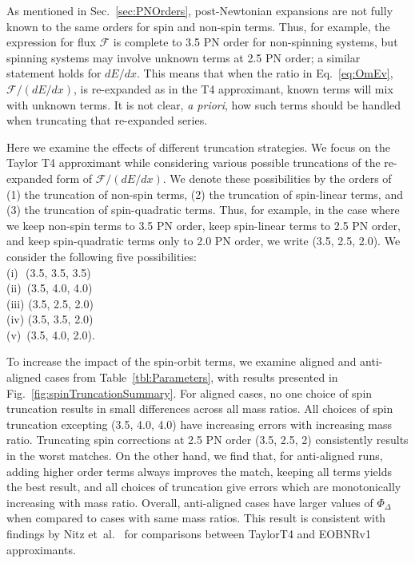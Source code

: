 \documentclass[aps,prd,amsmath,floatfix,twocolumn,superscriptaddress,nofootinbib,showpacs]{revtex4-1}
\begin{document}
As mentioned in Sec.~\ref{sec:PNOrders}, post-Newtonian expansions are
not fully known to the same orders for spin and non-spin terms.  Thus,
for example, the expression for flux $\mathcal{F}$ is complete to 3.5
PN order for non-spinning systems, but spinning systems may involve
unknown terms at 2.5 PN order; a similar statement holds for $dE/dx$.
This means that when the ratio in Eq.~\eqref{eq:OmEv}, $\mathcal{F} /
(dE/dx)$, is re-expanded as in the T4 approximant, known terms will
mix with unknown terms.  It is not clear, \textit{a priori}, how such
terms should be handled when truncating that re-expanded series.

Here we examine the effects of different truncation strategies.  We
focus on the Taylor T4 approximant while considering various possible
truncations of the re-expanded form of $\mathcal{F} / (dE/dx)$.  We
denote these possibilities by the orders of (1) the truncation of
non-spin terms, (2) the truncation of spin-linear terms, and (3) the
truncation of spin-quadratic terms.  Thus, for example, in the case
where we keep non-spin terms to 3.5 PN order, keep spin-linear terms
to 2.5 PN order, and keep spin-quadratic terms only to 2.0 PN order,
we write (3.5, 2.5, 2.0).  We consider the following five
possibilities:\\
\hspace*{1em}(i)\,\, (3.5, 3.5, 3.5)\\
\hspace*{1em}(ii)\, (3.5, 4.0, 4.0)\\
\hspace*{1em}(iii) (3.5, 2.5, 2.0)\\
\hspace*{1em}(iv) (3.5, 3.5, 2.0)\\
\hspace*{1em}(v)\, (3.5, 4.0, 2.0).
 
  To increase the impact of the spin-orbit terms, we examine aligned
  and anti-aligned cases from Table~\ref{tbl:Parameters}, with results
  presented in Fig.~\ref{fig:spinTruncationSummary}. For aligned
  cases, no one choice of spin truncation results in small differences
  across all mass ratios.  All choices of spin truncation excepting
  (3.5, 4.0, 4.0) have increasing errors with increasing mass ratio.
  Truncating spin corrections at 2.5 PN order (3.5, 2.5, 2)
  consistently results in the worst matches.  On the other hand, we
  find that, for anti-aligned runs, adding higher order terms always
  improves the match, keeping all terms yields the best result, and
  all choices of truncation give errors which are monotonically
  increasing with mass ratio. Overall, anti-aligned cases have larger
  values of $\Phi_{\Delta}$ when compared to cases with same mass
  ratios. This result is consistent with findings by Nitz
  et~al.~\cite{Nitz:2013mxa} for comparisons between TaylorT4 and
  EOBNRv1 approximants.
\end{document}
